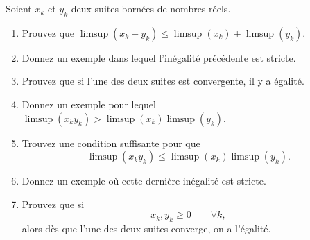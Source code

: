 
\begin{exercice}\label{exo0019}


Soient $x_k$ et $y_k$ deux suites bornées de nombres réels.
\begin{enumerate}
\item
Prouvez que $\limsup(x_k+y_k) \leq \limsup(x_k) + \limsup(y_k)$.
\item
Donnez un exemple dans lequel l'inégalité précédente est stricte.
\item
Prouvez que si l'une des deux suites est convergente, il y a égalité.
\item
Donnez un exemple pour lequel $\limsup(x_k y_k) >  \limsup(x_k)\limsup(y_k)$.
\item
Trouvez une condition suffisante pour que 
\begin{equation}		\label{EqLimSupxyLeqLSxLSy}
	\limsup(x_k y_k) \leq\limsup(x_k)  \limsup(y_k).
\end{equation}

\item
Donnez un exemple où cette dernière inégalité est stricte.
\item
Prouvez que si
\[
	x_k, y_k \geq 0 \qquad \forall k,
\]
alors dès que l'une des deux suites converge, on a l'égalité.
\end{enumerate}

\end{exercice}

